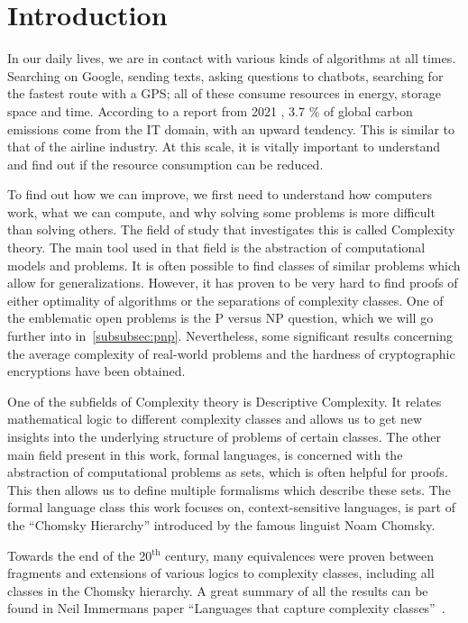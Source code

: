 \chapter{Introduction}\label{ch:intro}

In our daily lives, we are in contact with various kinds of algorithms at all times.
Searching on Google, sending texts, asking questions to chatbots, searching for the fastest route with a GPS; all of these consume resources in energy, storage space and time.
According to a report from 2021 \cite{webFootprint}, 3.7 \% of global carbon emissions come from the IT domain, with an upward tendency.
This is similar to that of the airline industry.
At this scale, it is vitally important to understand and find out if the resource consumption can be reduced.

To find out how we can improve, we first need to understand how computers work, what we can compute, and why solving some problems is more difficult than solving others.
The field of study that investigates this is called Complexity theory.
The main tool used in that field is the abstraction of computational models and problems.
It is often possible to find classes of similar problems which allow for generalizations.
However, it has proven to be very hard to find proofs of either optimality of algorithms or the separations of complexity classes.
One of the emblematic open problems is the P versus NP question, which we will go further into in~\cref{subsubsec:pnp}.
Nevertheless, some significant results concerning the average complexity of real-world problems and the hardness of cryptographic encryptions have been obtained.

One of the subfields of Complexity theory is Descriptive Complexity.
It relates mathematical logic to different complexity classes and allows us to get new insights into the underlying structure of problems of certain classes.
The other main field present in this work, formal languages, is concerned with the abstraction of computational problems as sets, which is often helpful for proofs.
This then allows us to define multiple formalisms which describe these sets.
The formal language class this work focuses on, context-sensitive languages, is part of the ``Chomsky Hierarchy'' introduced by the famous linguist Noam Chomsky.

Towards the end of the 20$^{\text{th}}$ century, many equivalences were proven between fragments and extensions of various logics to complexity classes, including all classes in the Chomsky hierarchy.
A great summary of all the results can be found in Neil Immermans paper ``Languages that capture complexity classes''~\cite{Immerman1987}.


